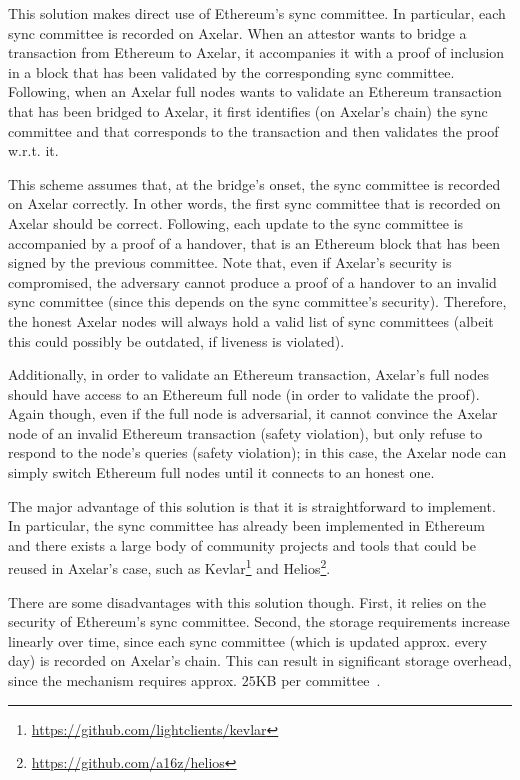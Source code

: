 This solution makes direct use of Ethereum's sync committee. In particular,
each sync committee is recorded on Axelar. When an attestor wants to bridge a
transaction from Ethereum to Axelar, it accompanies it with a proof of
inclusion in a block that has been validated by the corresponding sync
committee. Following, when an Axelar full nodes wants to validate an Ethereum
transaction that has been bridged to Axelar, it first identifies (on Axelar's
chain) the sync committee and that corresponds to the transaction and then
validates the proof w.r.t. it.

This scheme assumes that, at the bridge's onset, the sync committee is recorded
on Axelar correctly. In other words, the first sync committee that is recorded
on Axelar should be correct. Following, each update to the sync committee is
accompanied by a proof of a handover, that is an Ethereum block that has been
signed by the previous committee. Note that, even if Axelar's security is
compromised, the adversary cannot produce a proof of a handover to an invalid
sync committee (since this depends on the sync committee's security).
Therefore, the honest Axelar nodes will always hold a valid list of sync
committees (albeit this could possibly be outdated, if liveness is violated).

Additionally, in order to validate an Ethereum transaction, Axelar's full nodes
should have access to an Ethereum full node (in order to validate the proof).
Again though, even if the full node is adversarial, it cannot convince the
Axelar node of an invalid Ethereum transaction (safety violation), but only
refuse to respond to the node's queries (safety violation); in this case, the
Axelar node can simply switch Ethereum full nodes until it connects to an
honest one.

The major advantage of this solution is that it is straightforward to
implement. In particular, the sync committee has already been implemented in
Ethereum and there exists a large body of community projects and tools that
could be reused in Axelar's case, such as
Kevlar\footnote{\url{https://github.com/lightclients/kevlar}} and
Helios\footnote{\url{https://github.com/a16z/helios}}.

There are some disadvantages with this solution though. First, it relies on the
security of Ethereum's sync committee. Second, the storage requirements
increase linearly over time, since each sync committee (which is updated
approx. every day) is recorded on Axelar's chain. This can result in
significant storage overhead, since the mechanism requires approx. $25$KB per
committee~\cite{sync-committee}.


